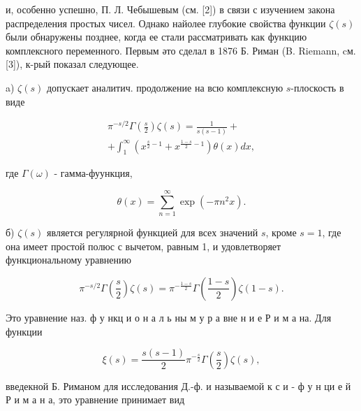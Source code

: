 \documentclass[10pt]{article}
\begin{document}
и, особенно успешно, П. Л. Чебышевым (см. [2]) в связи с изучением закона распределения простых чисел. Однако найолее глубокие свойства функции $\zeta(s)$ были обнаружены позднее, когда ее стали рассматривать как функцию комплексного переменного. Первым әто сделал в 1876 Б. Риман (B. Riemann, cм. [3]), к-рый показал следующее.



a) $\zeta(s)$ допускает аналитич. продолжение на всю комплексную $s$-плоскость в виде



\[

\begin{gathered}

\pi^{-s / 2} \Gamma\left(\frac{s}{2}\right) \zeta(s)=\frac{1}{s(s-1)}+ \\

+\int_{1}^{\infty}\left(x^{\frac{s}{2}-1}+x^{\frac{1-s}{2}-1}\right) \theta(x) d x,

\end{gathered}

\]



где $\Gamma(\omega)$ - гамма-фуункция,



\[

\theta(x)=\sum_{n=1}^{\infty} \exp \left(-\pi n^{2} x\right) .

\]



б) $\zeta(s)$ является регулярной функцией для всех значений $s$, кроме $s=1$, где она имеет простой полюс с вычетом, равным 1, и удовлетворяет функциональному уравнению



\[

\pi^{-s / 2} \Gamma\left(\frac{s}{2}\right) \zeta(s)=\pi^{-\frac{1-s}{2}} \Gamma\left(\frac{1-s}{2}\right) \zeta(1-s) .

\]



Это уравнение наз. ф у нкц и о н а л ь ны м у р а вне н и е Р и м а на. Для функции



\[

\xi(s)=\frac{s(s-1)}{2} \pi^{-\frac{s}{2}} \Gamma\left(\frac{s}{2}\right) \zeta(s),

\]



введекной Б. Риманом для исследования Д.-ф. и называемой к с и - ф у н ци е й Р и м а н а, это уравнение принимает вид
\end{document}
